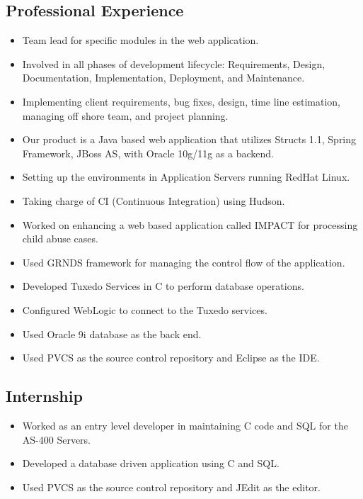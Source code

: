\documentclass[11pt,letterpaper,sans]{moderncv} %
\begin{document}
  \subsection{Professional Experience}
     {\begin{itemize}
         \item Team lead for specific modules in the web application.
         \item Involved in all phases of development lifecycle: Requirements, Design, Documentation, Implementation, Deployment, and Maintenance.
         \item Implementing client requirements, bug fixes, design, time line estimation, managing off shore team, and project planning.
         \item Our product is a Java based web application that utilizes Structs 1.1, Spring Framework, JBoss AS, with Oracle 10g/11g as a backend.
         \item Setting up the environments in Application Servers running RedHat Linux.
         \item Taking charge of CI (Continuous Integration) using Hudson.
     \end{itemize}}
     
     {\begin{itemize}
         \item Worked on enhancing a web based application called IMPACT for processing child abuse cases.
         \item Used GRNDS framework for managing the control flow of the application.
         \item Developed Tuxedo Services in C to perform database operations.
         \item Configured WebLogic to connect to the Tuxedo services.
         \item Used Oracle 9i database as the back end.
         \item Used PVCS as the source control repository and Eclipse as the IDE.
     \end{itemize}}

  \subsection{Internship}
     {\begin{itemize}
         \item Worked as an entry level developer in maintaining C code and SQL for the AS-400 Servers.
         \item Developed a database driven application using C and SQL.
         \item Used PVCS as the source control repository and JEdit as the editor.
     \end{itemize}}
  
\end{document}
